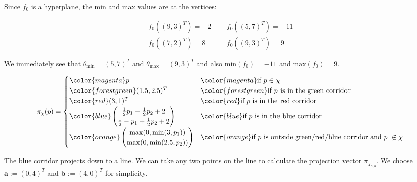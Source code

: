 %
%
%
\begin{flushleft}
Since $f_0$ is a hyperplane, the min and max values are at the vertices:
\end{flushleft}
\begin{align*}
  f_0((9,3)^T) = -2 \;\;\;\;\;& f_0((5,7)^T) = -11 \\ f_0((7,2)^T) = 8 \;\;\;\;\;& f_0((9,3)^T) = 9
\end{align*}
\begin{flushleft}
  We immediately see that $\theta_\text{min} = (5,7)^T$ and $\theta_\text{max} = (9,3)^T$ and also $\mathrm{min}(f_0) = -11$ and $\mathrm{max}(f_0) = 9$.
\end{flushleft}
%
%
%
\begin{equation*}
  \pi_\chi(p) = 
  \begin{cases}
    {\color{magenta}p} & {\color{magenta}\text{if } p\in \chi} \\
    {\color{forestgreen}(1.5,2.5)^T} & {\color{forestgreen}\text{if $p$ is in the green corridor}} \\
    {\color{red}(3,1)^T} & {\color{red}\text{if $p$ is in the red corridor}} \\
    {\color{blue}\begin{pmatrix}
      \frac{1}{2} p_1 - \frac{1}{2} p_2 + 2 \\
      \frac{1}{2} - p_1 + \frac{1}{2} p_2 + 2 \\
    \end{pmatrix}} & {\color{blue}\text{if $p$ is in the blue corridor}} \\
    {\color{orange}\begin{pmatrix}
      \mathrm{max}(0, \mathrm{min}(3, p_1)) \\
      \mathrm{max}(0, \mathrm{min}(2.5, p_2))
    \end{pmatrix}} & {\color{orange}\text{if $p$ is outside green/red/blue corridor and } p \not\in \chi}
    \end{cases} 
\end{equation*}
\begin{flushleft}
The blue corridor projects down to a line. We can take any two points on the line to calculate the projection vector $\pi_{\chi_{a,b}}$. We choose $\mathbf{a}:=(0,4)^T$ and $\mathbf{b}:=(4,0)^T$ for simplicity.
\end{flushleft}
